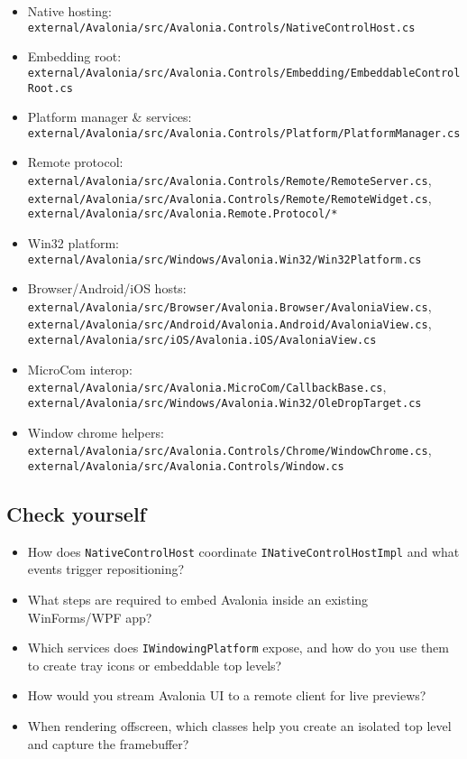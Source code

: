 \begin{itemize}
\tightlist
\item
  Native hosting:
  \passthrough{\lstinline!external/Avalonia/src/Avalonia.Controls/NativeControlHost.cs!}
\item
  Embedding root:
  \passthrough{\lstinline!external/Avalonia/src/Avalonia.Controls/Embedding/EmbeddableControlRoot.cs!}
\item
  Platform manager \& services:
  \passthrough{\lstinline!external/Avalonia/src/Avalonia.Controls/Platform/PlatformManager.cs!}
\item
  Remote protocol:
  \passthrough{\lstinline!external/Avalonia/src/Avalonia.Controls/Remote/RemoteServer.cs!},
  \passthrough{\lstinline!external/Avalonia/src/Avalonia.Controls/Remote/RemoteWidget.cs!},
  \passthrough{\lstinline!external/Avalonia/src/Avalonia.Remote.Protocol/*!}
\item
  Win32 platform:
  \passthrough{\lstinline!external/Avalonia/src/Windows/Avalonia.Win32/Win32Platform.cs!}
\item
  Browser/Android/iOS hosts:
  \passthrough{\lstinline!external/Avalonia/src/Browser/Avalonia.Browser/AvaloniaView.cs!},
  \passthrough{\lstinline!external/Avalonia/src/Android/Avalonia.Android/AvaloniaView.cs!},
  \passthrough{\lstinline!external/Avalonia/src/iOS/Avalonia.iOS/AvaloniaView.cs!}
\item
  MicroCom interop:
  \passthrough{\lstinline!external/Avalonia/src/Avalonia.MicroCom/CallbackBase.cs!},
  \passthrough{\lstinline!external/Avalonia/src/Windows/Avalonia.Win32/OleDropTarget.cs!}
\item
  Window chrome helpers:
  \passthrough{\lstinline!external/Avalonia/src/Avalonia.Controls/Chrome/WindowChrome.cs!},
  \passthrough{\lstinline!external/Avalonia/src/Avalonia.Controls/Window.cs!}
\end{itemize}

\subsection{Check yourself}\label{check-yourself-30}

\begin{itemize}
\tightlist
\item
  How does \passthrough{\lstinline!NativeControlHost!} coordinate
  \passthrough{\lstinline!INativeControlHostImpl!} and what events
  trigger repositioning?
\item
  What steps are required to embed Avalonia inside an existing
  WinForms/WPF app?
\item
  Which services does \passthrough{\lstinline!IWindowingPlatform!}
  expose, and how do you use them to create tray icons or embeddable top
  levels?
\item
  How would you stream Avalonia UI to a remote client for live previews?
\item
  When rendering offscreen, which classes help you create an isolated
  top level and capture the framebuffer?
\end{itemize}

